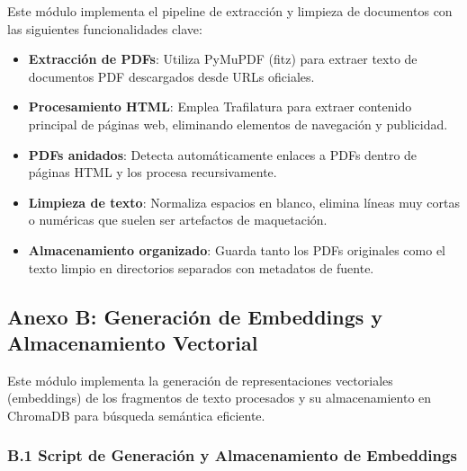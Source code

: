 \documentclass[a4paper,12pt]{article}
\begin{document}
Este módulo implementa el pipeline de extracción y limpieza de documentos con las siguientes funcionalidades clave:

\begin{itemize}
    \item \textbf{Extracción de PDFs}: Utiliza PyMuPDF (fitz) para extraer texto de documentos PDF descargados desde URLs oficiales.
    \item \textbf{Procesamiento HTML}: Emplea Trafilatura para extraer contenido principal de páginas web, eliminando elementos de navegación y publicidad.
    \item \textbf{PDFs anidados}: Detecta automáticamente enlaces a PDFs dentro de páginas HTML y los procesa recursivamente.
    \item \textbf{Limpieza de texto}: Normaliza espacios en blanco, elimina líneas muy cortas o numéricas que suelen ser artefactos de maquetación.
    \item \textbf{Almacenamiento organizado}: Guarda tanto los PDFs originales como el texto limpio en directorios separados con metadatos de fuente.
\end{itemize}

\subsection*{Anexo B: Generación de Embeddings y Almacenamiento Vectorial}

Este módulo implementa la generación de representaciones vectoriales (embeddings) de los fragmentos de texto procesados y su almacenamiento en ChromaDB para búsqueda semántica eficiente.

\subsubsection*{B.1 Script de Generación y Almacenamiento de Embeddings}
\end{document}
